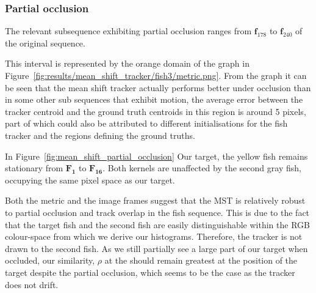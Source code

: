 
\subsubsection{Partial occlusion}\label{mean_shift_partial_occlusion}
The relevant subsequence exhibiting partial occlusion ranges from
$\mathbf{f}_{178}$ to $\mathbf{f}_{240}$ of the original sequence. 

This interval is represented by the orange domain of the graph in
Figure~\ref{fig:results/mean_shift_tracker/fish3/metric.png}. From the graph it can be
seen that the mean shift tracker actually performs better under occlusion than in
some other sub sequences that exhibit motion, the average error between the
tracker centroid and the ground truth centroids in this region is around 5
pixels, part of which could also be attributed to different initialisations for
the fish tracker and the regions defining the ground truths.

In Figure~\ref{fig:mean_shift_partial_occlusion} Our target, the yellow fish
remains stationary from $\mathbf{F_{1}}$ to $\mathbf{F_{16}}$. Both kernels are
unaffected by the second gray fish, occupying the same pixel space as our
target. 

Both the metric and the image frames suggest that the MST is relatively robust
to partial occlusion and track overlap in the fish sequence. This is due to the fact that the target
fish and the second fish are easily distinguishable within the RGB colour-space
from which we derive our histograms. Therefore, the tracker is not drawn to the
second fish. As we still partially see a large part of our target when
occluded, our similarity, $\rho$ at the should remain greatest at the position
of the target despite the partial occlusion, which seems to be the case as the
tracker does not drift.

